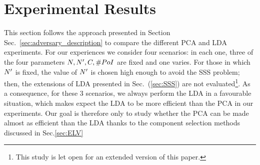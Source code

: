 \section{Experimental Results}\label{sec:experiments}
This section follows the approach presented in Section Sec.~\ref{sec:adversary_description} to compare the different PCA and LDA experiments. For our experiences we consider four scenarios: in each one, three of the four parameters $\numTraces[], \numTraces[]', \newTraceLength, \numPoI$ are fixed and one varies. For those in which $\numTraces[]'$ is fixed, the value of $\numTraces[]'$ is chosen high enough to avoid the SSS problem; then, the extensions of LDA presented in Sec.~(\ref{sec:SSS}) are not evaluated\footnote{This study is let open for an extended version of this paper.}. As a consequence, for these 3 scenarios, we always perform the LDA in a favourable situation, which makes expect the LDA to be more efficient than the PCA in our experiments. Our goal is therefore only to study whether the PCA can be made almost as efficient than the LDA thanks to the component selection methods discussed in Sec.\ref{sec:ELV}

